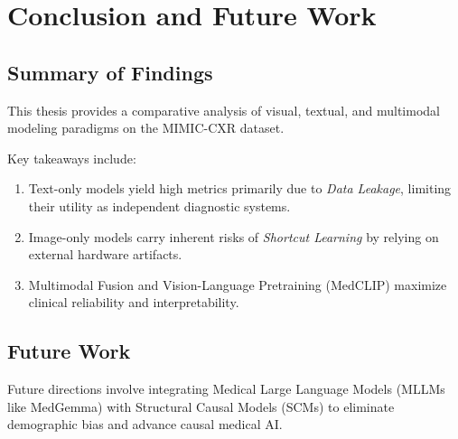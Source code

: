 \chapter{Conclusion and Future Work}
\label{ch:conclusion}

\section{Summary of Findings}
This thesis provides a comparative analysis of visual, textual, and multimodal modeling paradigms on the MIMIC-CXR dataset.

Key takeaways include:
\begin{enumerate}
    \item Text-only models yield high metrics primarily due to \textit{Data Leakage}, limiting their utility as independent diagnostic systems.
    \item Image-only models carry inherent risks of \textit{Shortcut Learning} by relying on external hardware artifacts.
    \item Multimodal Fusion and Vision-Language Pretraining (MedCLIP) maximize clinical reliability and interpretability.
\end{enumerate}

\section{Future Work}
Future directions involve integrating Medical Large Language Models (MLLMs like MedGemma) with Structural Causal Models (SCMs) to eliminate demographic bias and advance causal medical AI.
